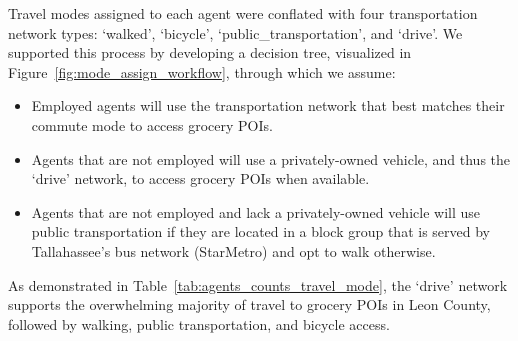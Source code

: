 

Travel modes assigned to each agent were conflated with four transportation network types: `walked', `bicycle', `public\_transportation', and `drive'. We supported this process by developing a decision tree, visualized in Figure~\ref{fig:mode_assign_workflow}, through which we assume:

\begin{itemize}
    \item Employed agents will use the transportation network that best matches their commute mode to access grocery POIs.
    \item Agents that are not employed will use a privately-owned vehicle, and thus the `drive' network, to access grocery POIs when available.
    \item Agents that are not employed and lack a privately-owned vehicle will use public transportation if they are located in a block group that is served by Tallahassee's bus network (StarMetro) and opt to walk otherwise. 
\end{itemize}


As demonstrated in Table~\ref{tab:agents_counts_travel_mode}, the `drive' network supports the overwhelming majority of travel to grocery POIs in Leon County, followed by walking, public transportation, and bicycle access. 



